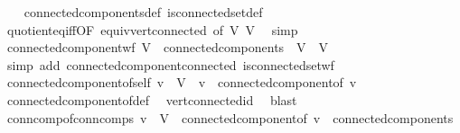 \begin{isabellebody}
%
\isadelimproof
\ \ %
\endisadelimproof
%
\isatagproof
{}\isamarkupfalse%
\ connected{\isacharunderscore}{\kern0pt}components{\isacharunderscore}{\kern0pt}def\ is{\isacharunderscore}{\kern0pt}connected{\isacharunderscore}{\kern0pt}set{\isacharunderscore}{\kern0pt}def\ \isamarkupfalse%
\ quotient{\isacharunderscore}{\kern0pt}eq{\isacharunderscore}{\kern0pt}iff{\isacharbrackleft}{\kern0pt}OF\ equiv{\isacharunderscore}{\kern0pt}vert{\isacharunderscore}{\kern0pt}connected{\isacharcomma}{\kern0pt}\ of\ V{\isacharprime}{\kern0pt}\ V{\isacharprime}{\kern0pt}{\isacharbrackright}{\kern0pt}\ \isamarkupfalse%
\ simp%
\endisatagproof
{\isafoldproof}%
%
\isadelimproof
\isanewline
%
\endisadelimproof
\isanewline
{}\isamarkupfalse%
\ connected{\isacharunderscore}{\kern0pt}component{\isacharunderscore}{\kern0pt}wf{\isacharcolon}{\kern0pt}\ {\isachardoublequoteopen}V{\isacharprime}{\kern0pt}\ {\isasymin}\ connected{\isacharunderscore}{\kern0pt}components\ {\isasymLongrightarrow}\ V{\isacharprime}{\kern0pt}\ {\isasymsubseteq}\ V{\isachardoublequoteclose}\isanewline
%
\isadelimproof
\ \ %
\endisadelimproof
%
\isatagproof
{}\isamarkupfalse%
\ {\isacharparenleft}{\kern0pt}simp\ add{\isacharcolon}{\kern0pt}\ connected{\isacharunderscore}{\kern0pt}component{\isacharunderscore}{\kern0pt}connected\ is{\isacharunderscore}{\kern0pt}connected{\isacharunderscore}{\kern0pt}set{\isacharunderscore}{\kern0pt}wf{\isacharparenright}{\kern0pt}%
\endisatagproof
{\isafoldproof}%
%
\isadelimproof
\isanewline
%
\endisadelimproof
\isanewline
{}\isamarkupfalse%
\ connected{\isacharunderscore}{\kern0pt}component{\isacharunderscore}{\kern0pt}of{\isacharunderscore}{\kern0pt}self{\isacharcolon}{\kern0pt}\ {\isachardoublequoteopen}v\ {\isasymin}\ V\ {\isasymLongrightarrow}\ v\ {\isasymin}\ connected{\isacharunderscore}{\kern0pt}component{\isacharunderscore}{\kern0pt}of\ v{\isachardoublequoteclose}\isanewline
%
\isadelimproof
\ \ %
\endisadelimproof
%
\isatagproof
{}\isamarkupfalse%
\ connected{\isacharunderscore}{\kern0pt}component{\isacharunderscore}{\kern0pt}of{\isacharunderscore}{\kern0pt}def\ \isamarkupfalse%
\ vert{\isacharunderscore}{\kern0pt}connected{\isacharunderscore}{\kern0pt}id\ \isamarkupfalse%
\ blast%
\endisatagproof
{\isafoldproof}%
%
\isadelimproof
\isanewline
%
\endisadelimproof
\isanewline
{}\isamarkupfalse%
\ conn{\isacharunderscore}{\kern0pt}comp{\isacharunderscore}{\kern0pt}of{\isacharunderscore}{\kern0pt}conn{\isacharunderscore}{\kern0pt}comps{\isacharcolon}{\kern0pt}\ {\isachardoublequoteopen}v\ {\isasymin}\ V\ {\isasymLongrightarrow}\ connected{\isacharunderscore}{\kern0pt}component{\isacharunderscore}{\kern0pt}of\ v\ {\isasymin}\ connected{\isacharunderscore}{\kern0pt}components{\isachardoublequoteclose}\isanewline

\end{isabellebody}
